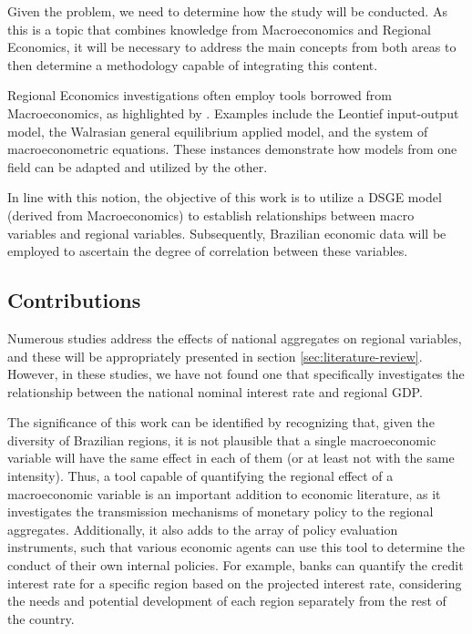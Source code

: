 \documentclass[../thesis.tex]{subfiles}
\begin{document}
Given the problem, we need to determine how the study will be conducted. As this is a topic that combines knowledge from Macroeconomics and Regional Economics, it will be necessary to address the main concepts from both areas to then determine a methodology capable of integrating this content.

Regional Economics investigations often employ tools borrowed from Macroeconomics, as highlighted by \textcite{rickman_modern_2010}. Examples include the Leontief input-output model, the Walrasian general equilibrium applied model, and the system of macroeconometric equations. These instances demonstrate how models from one field can be adapted and utilized by the other.

In line with this notion, the objective of this work is to utilize a DSGE model (derived from Macroeconomics) to establish relationships between macro variables and regional variables. Subsequently, Brazilian economic data will be employed to ascertain the degree of correlation between these variables.

\subsection*{Contributions}

Numerous studies address the effects of national aggregates on regional variables, and these will be appropriately presented in section \ref{sec:literature-review}. However, in these studies, we have not found one that specifically investigates the relationship between the national nominal interest rate and regional GDP.

The significance of this work can be identified by recognizing that, given the diversity of Brazilian regions, it is not plausible that a single macroeconomic variable will have the same effect in each of them (or at least not with the same intensity). Thus, a tool capable of quantifying the regional effect of a macroeconomic variable is an important addition to economic literature, as it investigates the transmission mechanisms of monetary policy to the regional aggregates. Additionally, it also adds to the array of policy evaluation instruments, such that various economic agents can use this tool to determine the conduct of their own internal policies. For example, banks can quantify the credit interest rate for a specific region based on the projected interest rate, considering the needs and potential development of each region separately from the rest of the country.
\end{document}
